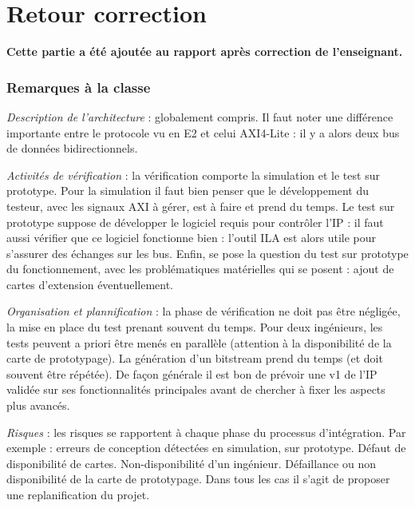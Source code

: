 \section{Retour correction}
\textbf{Cette partie a été ajoutée au rapport après correction de l'enseignant.}

\subsubsection{Remarques à la classe}
\emph{Description de l'architecture} : globalement compris. Il faut noter une différence importante entre le protocole vu en E2 et celui AXI4-Lite : il y a alors deux bus de données bidirectionnels.

\gap
\emph{Activités de vérification} : la vérification comporte la simulation et le test sur prototype. Pour la simulation il faut bien penser que le développement du testeur, avec les signaux AXI à gérer, est à faire et prend du temps. Le test sur prototype suppose de développer le logiciel requis pour contrôler l'IP : il faut aussi vérifier que ce logiciel fonctionne bien : l'outil ILA est alors utile pour s'assurer des échanges sur les bus. Enfin, se pose la question du test sur prototype du fonctionnement, avec les problématiques matérielles qui se posent : ajout de cartes d'extension éventuellement.

\gap
\emph{Organisation et plannification} : la phase de vérification ne doit pas être négligée, la mise en place du test prenant souvent du temps. Pour deux ingénieurs, les tests peuvent a priori être menés en parallèle (attention à la disponibilité de la carte de prototypage). La génération d'un bitstream prend du temps (et doit souvent être répétée). De façon générale il est bon de prévoir une v1 de l'IP validée sur ses fonctionnalités principales avant de chercher à fixer les aspects plus avancés.

\gap
\emph{Risques} : les risques se rapportent à chaque phase du processus d'intégration. Par exemple : erreurs de conception détectées en simulation, sur prototype. Défaut de disponibilité de cartes. Non-disponibilité d'un ingénieur. Défaillance ou non disponibilité de la carte de prototypage. Dans tous les cas il s'agit de proposer une replanification du projet.

\gap

